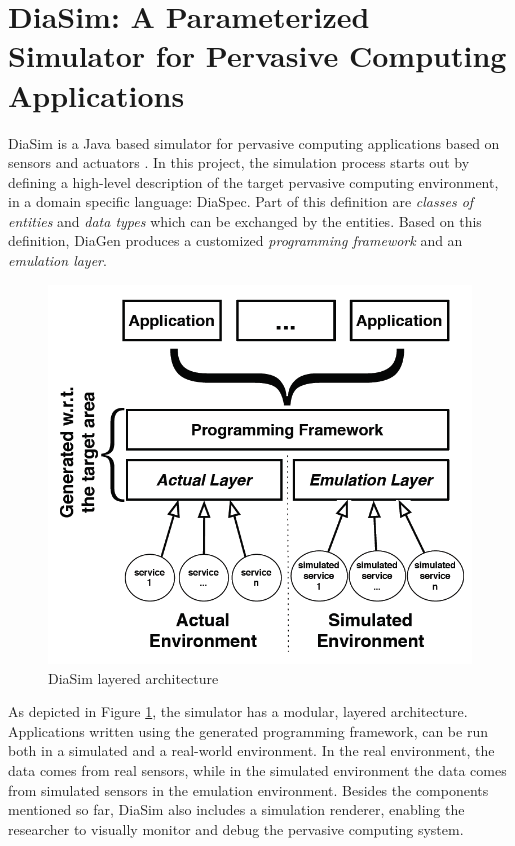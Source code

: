 \section{DiaSim: A Parameterized Simulator for Pervasive Computing Applications}\label{sec:diasim}

DiaSim is a Java based simulator for pervasive computing applications based on sensors and actuators \cite{bruneau2013diasim}. In this project, the simulation process starts out by defining a high-level description of the target pervasive computing environment, in a domain specific language: DiaSpec. Part of this definition are \emph{classes of entities} and \emph{data types} which can be exchanged by the entities. Based on this definition, DiaGen produces a customized \emph{programming framework} and an \emph{emulation layer}.\\

\begin{figure}[H]
	\centering
	\includegraphics[width=\linewidth]{gfx/Chapter2/diasim_layered_architecture}
	\caption{DiaSim layered architecture}
	\label{fig:diasim_architecture}
\end{figure}

As depicted in Figure \ref{fig:diasim_architecture}, the simulator has a modular, layered architecture. Applications written using the generated programming framework, can be run both in a simulated and a real-world environment. In the real environment, the data comes from real sensors, while in the simulated environment the data comes from simulated sensors in the emulation environment. Besides the components mentioned so far, DiaSim also includes a simulation renderer, enabling the researcher to visually monitor and debug the pervasive computing system.\\


